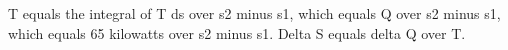 T equals the integral of T ds over s2 minus s1, which equals Q over s2 minus s1, which equals 65 kilowatts over s2 minus s1. Delta S equals delta Q over T.